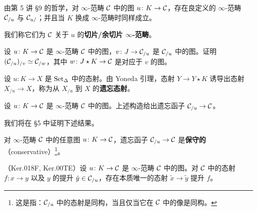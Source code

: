 
\nitem\label{L6-3.7} 由第 5 讲 §9 的哲学，对 $\infty$-范畴 $\mathcal{C}$ 中的图 $u\colon K\to\mathcal{C}$，存在良定义的 $\infty$-范畴 $\mathcal{C}_{/u}$ 与 $\mathcal{C}_{u/}$；并且当 $K$ 换成 $\infty$-范畴时同样成立。

我们称它们为 $\mathcal{C}$ 关于 $u$ 的\textbf{切片/余切片 $\infty$-范畴}。

\begin{exercise}\label{L6-3.8}
设 $u\colon K\to\mathcal{C}$ 是 $\infty$-范畴 $\mathcal{C}$ 中的图，$v\colon J\to\mathcal{C}_{/u}$ 是 $\mathcal{C}_{/u}$ 中的图。证明 $(\mathcal{C}_{/u})_{/v}\simeq\mathcal{C}_{/w}$，其中 $w\colon J\star K\to\mathcal{C}$ 是对应于 $v$ 的图。
\end{exercise}

\begin{construction}\label{L6-3.9}
设 $u\colon K\to X$ 是 $\operatorname{Set}_\Delta$ 中的态射。由 Yoneda 引理，态射 $Y\to Y\star K$ 诱导出态射 $X_{/u}\to X$，称为从 $X_{/u}$ 到 $X$ 的\textbf{遗忘态射}。

设 $u\colon K\to\mathcal{C}$ 是 $\infty$-范畴 $\mathcal{C}$ 中的图。上述构造给出遗忘函子 $\mathcal{C}_{/u}\to\mathcal{C}$。
\end{construction}

\nitem\label{L6-3.10} 我们将在 §5 中证明下述结果。

\begin{proposition}\label{L6-3.11}
对 $\infty$-范畴 $\mathcal{C}$ 中的任意图 $u\colon K\to\mathcal{C}$，遗忘函子 $\mathcal{C}_{/u}\to\mathcal{C}$ 是\textbf{保守的}（conservative）\footnote{这是指：$\mathcal{C}_{/u}$ 中的态射是同构，当且仅当它在 $\mathcal{C}$ 中的像是同构。}。
\end{proposition}

\begin{proposition}\label{L6-3.12}
（Ker.018F, Ker.00TE）设 $u\colon K\to\mathcal{C}$ 是 $\infty$-范畴 $\mathcal{C}$ 中的图。对 $\mathcal{C}$ 中的态射 $f\colon x\to y$ 以及 $y$ 的提升 $\tilde y\in\mathcal{C}_{/u}$，存在本质唯一的态射 $\tilde x\to\tilde y$ 提升 $f$。
\end{proposition}

